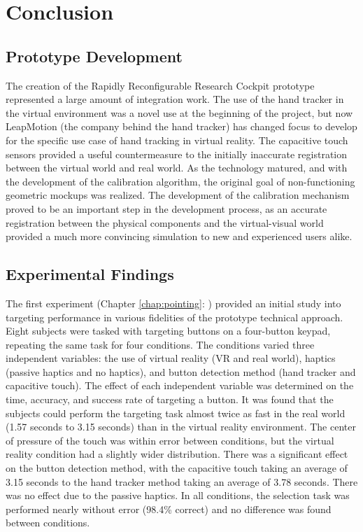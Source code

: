 \chapter{Conclusion}
\label{chap:conclusion}

\section{Prototype Development}

The creation of the Rapidly Reconfigurable Research Cockpit prototype represented a large amount of integration work.
The use of the hand tracker in the virtual environment was a novel use at the beginning of the project, but now LeapMotion (the company behind the hand tracker) has changed focus to develop for the specific use case of hand tracking in virtual reality.
The capacitive touch sensors provided a useful countermeasure to the initially inaccurate registration between the virtual world and real world.
As the technology matured, and with the development of the calibration algorithm, the original goal of non-functioning geometric mockups was realized.
The development of the calibration mechanism proved to be an important step in the development process, as an accurate registration between the physical components and the virtual-visual world provided a much more convincing simulation to new and experienced users alike.

\section{Experimental Findings}

The first experiment (Chapter \ref{chap:pointing}: ) provided an initial study into targeting performance in various fidelities of the prototype technical approach.
Eight subjects were tasked with targeting buttons on a four-button keypad, repeating the same task for four conditions.
The conditions varied three independent variables: the use of virtual reality (VR and real world), haptics (passive haptics and no haptics), and button detection method (hand tracker and capacitive touch).
The effect of each independent variable was determined on the time, accuracy, and success rate of targeting a button.
It was found that the subjects could perform the targeting task almost twice as fast in the real world (1.57 seconds to 3.15 seconds) than in the virtual reality environment.
The center of pressure of the touch was within error between conditions, but the virtual reality condition had a slightly wider distribution.
There was a significant effect on the button detection method, with the capacitive touch taking an average of 3.15 seconds to the hand tracker method taking an average of 3.78 seconds.
There was no effect due to the passive haptics.
In all conditions, the selection task was performed nearly without error (98.4\% correct) and no difference was found between conditions.

